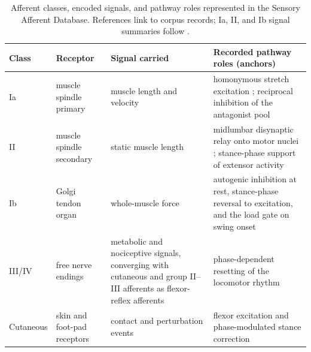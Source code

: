 \begin{table}[htbp]
\caption{Afferent classes, encoded signals, and pathway roles represented in the Sensory Afferent Database. References link to corpus records; Ia, II, and Ib signal summaries follow \citet{prochazka_ensemble_1998}.}
\label{tab:sadb_afferents}
\small
\begin{tabularx}{\textwidth}{@{}>{\raggedright\arraybackslash}p{}>{\raggedright\arraybackslash}p{}>{\raggedright\arraybackslash}p{}>{\raggedright\arraybackslash}X@{}}
\toprule
\textbf{Class} & \textbf{Receptor} & \textbf{Signal carried} & \textbf{Recorded pathway roles (anchors)} \\
\midrule
Ia & muscle spindle primary & muscle length and velocity & homonymous stretch excitation \citep{eccles_integrative_1958}; reciprocal inhibition of the antagonist pool \citep{jankowska_effect_1967} \\
II & muscle spindle secondary & static muscle length & midlumbar disynaptic relay onto motor nuclei \citep{edgley_interneuronal_1987}; stance-phase support of extensor activity \citep{mazzaro_afferent_2006} \\
Ib & Golgi tendon organ & whole-muscle force & autogenic inhibition at rest, stance-phase reversal to excitation, and the load gate on swing onset \citep{dietz_significance_2000, dominguez_candidate_2020} \\
III/IV & free nerve endings & metabolic and nociceptive signals, converging with cutaneous and group II--III afferents as flexor-reflex afferents & phase-dependent resetting of the locomotor rhythm \citep{schomburg_flexor_1998} \\
Cutaneous & skin and foot-pad receptors & contact and perturbation events & flexor excitation and phase-modulated stance correction \citep{sherrington_flexion_1910, forssberg_stumbling_1979} \\
\bottomrule
\end{tabularx}
\end{table}

